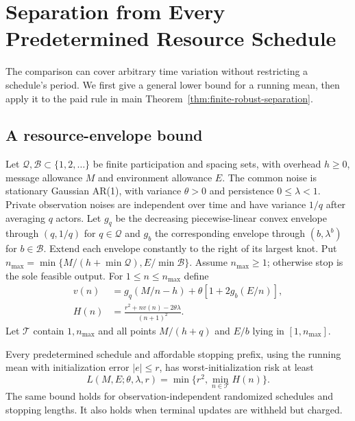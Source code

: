 \section{Separation from Every Predetermined Resource Schedule}
\label{sec:arbitrary-schedule}
The comparison can cover arbitrary time variation without restricting a schedule's period.
We first give a general lower bound for a running mean, then apply it to the paid rule in main Theorem~\ref{thm:finite-robust-separation}.

\subsection{A resource-envelope bound}
Let $\mathcal Q,\mathcal B\subset\{1,2,\ldots\}$ be finite participation and spacing sets, with overhead $h\ge0$, message allowance $M$ and environment allowance $E$.
The common noise is stationary Gaussian AR(1), with variance $\theta>0$ and persistence $0\le\lambda<1$.
Private observation noises are independent over time and have variance $1/q$ after averaging $q$ actors.
Let $g_q$ be the decreasing piecewise-linear convex envelope through $(q,1/q)$ for $q\in\mathcal Q$ and $g_b$ the corresponding envelope through $(b,\lambda^b)$ for $b\in\mathcal B$.
Extend each envelope constantly to the right of its largest knot.
Put $n_{\max}=\min\{M/(h+\min\mathcal Q),E/\min\mathcal B\}$.
Assume $n_{\max}\ge1$; otherwise stop is the sole feasible output.
For $1\le n\le n_{\max}$ define
\begin{align*}
v(n)&=g_q(M/n-h)+\theta[1+2g_b(E/n)],\\
H(n)&=\frac{r^2+nv(n)-2\theta\lambda}{(n+1)^2}.
\end{align*}
Let $\mathcal T$ contain $1,n_{\max}$ and all points $M/(h+q)$ and $E/b$ lying in $[1,n_{\max}]$.

\begin{proposition}
Every predetermined schedule and affordable stopping prefix, using the running mean with initialization error $|e|\le r$, has worst-initialization risk at least
\[
L(M,E;\theta,\lambda,r)=\min\{r^2,\min_{n\in\mathcal T}H(n)\}.
\]
The same bound holds for observation-independent randomized schedules and stopping lengths.
It also holds when terminal updates are withheld but charged.
\end{proposition}

